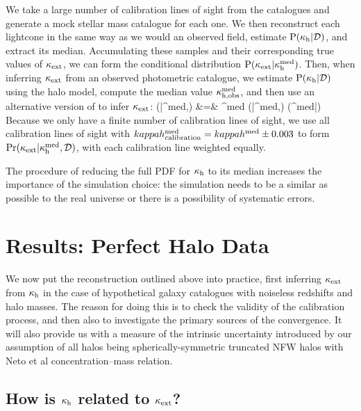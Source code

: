 \documentclass[useAMS,usenatbib]{mn2e}
\begin{document}
We  take a large number of
calibration lines of sight from the \MS catalogues and generate a mock
stellar mass catalogue for each one. We then reconstruct each lightcone in the
same way as we would an observed field,
estimate ${\rm P}(\kappa_{\rm h}|{\mathcal{D}})$, and extract its median. Accumulating
these samples and their corresponding true values of $\kappa_{\rm ext}$, we can form the 
conditional distribution ${\rm P}(\kappa_{\rm ext}|\kappa_{\rm h}^{\rm med})$. 
Then, when inferring $\kappa_{\rm ext}$ from an observed photometric catalogue, we 
estimate ${\rm P}(\kappa_{\rm h}|{\mathcal{D}})$ 
using the halo model, compute the median value 
$\kappa_{\rm h,obs}^{\rm med}$, and then use an alternative
version of 
 to infer $\kappa_{\rm ext}$: 
\bea
\Pr(\kappax|\kappah^{\rm med},) &=& \int \dee\kappah^{\rm med} 
   \Pr(\kappax|\kappah^{\rm med},) \Pr(\kappah^{\rm med}|) \notag \\
\label{eq:calkappaconv}   
\eea
Because we only have a finite number of calibration lines of sight, we use all calibration
lines of sight with $kappah_{\rm calibration}^{\rm med} = kappah^{\rm med}\pm0.003$ to form
$\Pr(\kappa_{\rm ext}|\kappa_{\rm h}^{\rm med},\mathcal{D})$, with each calibration line weighted
equally. 

The procedure of reducing the full PDF for $\kappa_{\rm h}$ to its median increases the 
importance of the simulation choice: the simulation needs to be a similar as possible
to the real universe or there is a possibility of systematic errors. 
\section{Results: Perfect Halo Data}
\label{sec:knownMh+z} 

We now put the reconstruction \proceedure outlined above into practice, first
inferring $\kappa_{\rm ext}$ from $\kappa_{\rm h}$ in the case of hypothetical galaxy catalogues
with noiseless redshifts and halo masses. The reason for doing this is to
check the validity of the calibration process, and then also to  investigate
the primary sources of the convergence. It will also provide us with a measure
of the intrinsic uncertainty introduced by our assumption of all halos being
spherically-symmetric truncated NFW halos with Neto et al concentration--mass
relation.


\subsection{How is $\kappa_{\rm h}$ related to $\kappa_{\rm ext}$?}
\end{document}
